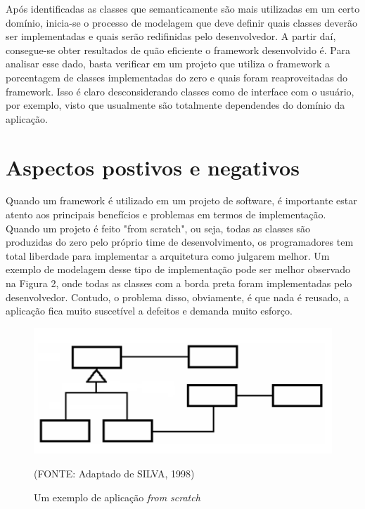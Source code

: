 \documentclass[
    12pt,       %
    openright,      %
    twoside,      %
    a4paper,      %
    english,      %
    french,       %
    spanish,      %
    brazil,       %
    ]{abntex2}
\begin{document}
          Após identificadas as classes que semanticamente são mais utilizadas em um
          certo domínio, inicia-se o processo de modelagem
          que deve definir quais classes deverão ser implementadas e quais serão
          redifinidas pelo desenvolvedor. A partir daí, consegue-se obter resultados
          de quão eficiente o framework desenvolvido é. Para analisar esse dado,
          basta verificar em um projeto que utiliza o framework a porcentagem
          de classes implementadas do zero e quais foram reaproveitadas do framework.
          Isso é claro desconsiderando classes como de interface com o usuário, por
          exemplo, visto que usualmente são totalmente dependendes do domínio da aplicação.

      \section{Aspectos postivos e negativos}
          Quando um framework é utilizado em um projeto de software, é importante estar
          atento aos principais benefícios e problemas em termos de implementação. Quando
          um projeto é feito "from scratch", ou seja, todas as classes são produzidas do
          zero pelo próprio time de desenvolvimento, os programadores tem total liberdade
          para implementar a arquitetura como julgarem melhor. Um exemplo de modelagem desse
          tipo de implementação pode ser melhor observado na Figura 2, onde todas as classes
          com a borda preta foram implementadas pelo desenvolvedor. Contudo, o problema
          disso, obviamente, é que nada é reusado, a aplicação fica muito suscetível a
          defeitos e demanda muito esforço.

          \begin{figure}[htbp]
              \begin{center}
                  \includegraphics[width=1.0\textwidth]{img/scratch.png}
              \end{center}
              \caption{\label{fig:passaro}Um exemplo de aplicação \textit{from scratch}}
              \begin{center}(FONTE: Adaptado de SILVA, 1998)\end{center}
          \end{figure}
\end{document}
